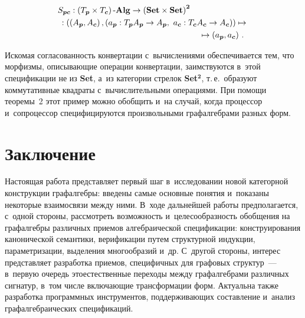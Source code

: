 \begin{multicols}{2}
\vspace*{-2pt}

\noindent
  \begin{align*}
  S_{\boldsymbol{pc}} &: \left( T_{\boldsymbol{p}} \times T_{\boldsymbol{c}}\right)\mbox{-}\mathbf{Alg} 
  \to \left( \mathbf{Set} 
\times \mathbf{Set}\right)^{\mathbf{2}}\\
&  \hspace*{-13.41975pt}:   \left(\left( A_{\boldsymbol{p}}, A_{\boldsymbol{c}}\right), \left(
   a_{\boldsymbol{p}} : T_{\boldsymbol{p}} A_{\boldsymbol{p}}\to 
   A_{\boldsymbol{p}},\ a_{\boldsymbol{c}} : T_{\boldsymbol{c}}A_{\boldsymbol{c}}\to 
A_{\boldsymbol{c}}\right)\right)\mapsto{}\\
&\hspace*{55mm}{}\mapsto \left(a_{\boldsymbol{p}}, a_{\boldsymbol{c}}\right)\,.
  \end{align*}
  
  \vspace*{-2pt}
  
  \noindent
Искомая согласованность конвертации с~вы\-чис\-ле\-ни\-ями обеспечивается тем, 
что морфизмы, опи\-сы\-ва\-ющие операции конвертации, заимствуются в~этой 
спецификации не из \textbf{Set}, а~из категории стрелок 
\textbf{Set}$^{\boldsymbol{2}}$, т.\,е.\ образуют коммутативные квад\-ра\-ты 
с~вы\-чис\-ли\-тель\-ны\-ми операциями. При помощи тео\-ре\-мы~2 этот пример можно 
обобщить и~на случай, когда процессор и~сопроцессор специфицируются 
произвольными графалгебрами разных форм.

\vspace*{-6pt}

\section{Заключение}
  
  Настоящая работа представляет первый шаг в~исследовании новой 
категорной конструкции графалгебры: введены самые основные понятия 
и~показаны некоторые взаимосвязи между ними. В~ходе дальнейшей работы 
предполагается, с~одной стороны, рас\-смот\-реть воз\-мож\-ность и~це\-ле\-со\-об\-раз\-ность 
обобщения на графалгебры различных приемов алгебраической спецификации: 
конструирования канонической семантики, верификации путем структурной 
индукции, па\-ра\-мет\-ри\-за\-ции, выделения многообразий и~др. С~другой стороны, 
интерес пред\-став\-ля\-ет разработка приемов, специфичных для графовых 
структур~--- в~первую очередь это\linebreak естественные переходы между 
графалгебрами различных сигнатур, в~том чис\-ле вклю\-ча\-ющие трансформации 
форм. Актуальна так\-же разработка программных инструментов, 
под\-дер\-жи\-ва\-ющих \mbox{со\-став\-ле\-ние} и~анализ графалгебраических спецификаций.


\end{multicols}
